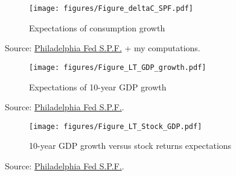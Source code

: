 \begin{frame}
\begin{figure}
\caption{Expectations of consumption growth}
		\texttt{[image: figures/Figure\_deltaC\_SPF.pdf]}
\end{figure}
\begin{center}
\begin{scriptsize}
Source: \href{https://www.philadelphiafed.org/research-and-data/real-time-center/survey-of-professional-forecasters/data-files/rconsum}{Philadelphia Fed S.P.F.} + my computations.
\end{scriptsize}
\end{center}
\end{frame}

\begin{frame}
\begin{center}
\begin{figure}
\caption{Expectations of 10-year GDP growth}
		\texttt{[image: figures/Figure\_LT\_GDP\_growth.pdf]}
\end{figure}
\begin{scriptsize}

Source: \href{https://www.philadelphiafed.org/research-and-data/real-time-center/survey-of-professional-forecasters/data-files/rgdp10}{Philadelphia Fed S.P.F.}.
\end{scriptsize}
\end{center}
\end{frame}

\begin{frame}
\begin{center}
\begin{figure}
\caption{10-year GDP growth versus stock returns expectations}
		\texttt{[image: figures/Figure\_LT\_Stock\_GDP.pdf]}
\end{figure}
\begin{scriptsize}

Source: \href{https://www.philadelphiafed.org/research-and-data/real-time-center/survey-of-professional-forecasters/data-files/rgdp10}{Philadelphia Fed S.P.F.}.
\end{scriptsize}
\end{center}
\end{frame}



